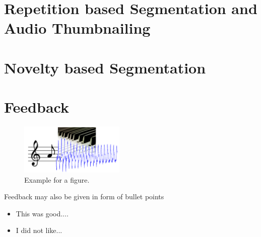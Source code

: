 \documentclass[a4paper, 9pt, twocolumn]{extarticle}
\begin{document}
\section{Repetition based Segmentation and Audio Thumbnailing}
\label{section:repetition}

\section{Novelty based Segmentation}
\label{section:novelty}


\section{Feedback}
\label{section:feedback}


 \begin{figure}[t]
 \begin{center}
 \includegraphics[width=5cm]{figure_example.png}
 \end{center}
 \caption{
 Example for a figure.
 }
 \label{figure:example}
 \end{figure}


Feedback may also be given in form of bullet points
\begin{itemize}
\item This was good....
\item I did not like...
\end{itemize}




\small

\end{document}
